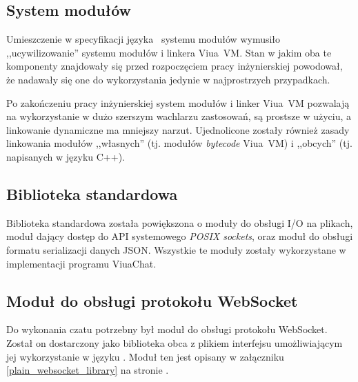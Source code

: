 \subsection{System modułów}

Umieszczenie w specyfikacji języka \ViuAct\ systemu modułów wymusiło
,,ucywilizowanie'' systemu modułów i linkera Viua~VM. Stan w jakim oba te
komponenty znajdowały się przed rozpoczęciem pracy inżynierskiej powodował, że
nadawały się one do wykorzystania jedynie w najprostrzych przypadkach.

Po zakończeniu pracy inżynierskiej system modułów i linker Viua~VM pozwalają na
wykorzystanie w dużo szerszym wachlarzu zastosowań, są prostsze w użyciu, a
linkowanie dynamiczne ma mniejszy narzut. Ujednolicone zostały również zasady
linkowania modułów ,,własnych'' (tj. modułów \emph{bytecode} Viua~VM) i
,,obcych'' (tj. napisanych w języku C++).

\subsection{Biblioteka standardowa}

Biblioteka standardowa została powiększona o moduły do obsługi I/O na plikach,
moduł dający dostęp do API systemowego \emph{POSIX sockets}, oraz moduł do
obsługi formatu serializacji danych JSON.
Wszystkie te moduły zostały wykorzystane w implementacji programu ViuaChat.

\subsection{Moduł do obsługi protokołu WebSocket}

Do wykonania czatu potrzebny był moduł do obsługi protokołu WebSocket.
Został on dostarczony jako biblioteka obca z plikiem interfejsu umożliwiającym
jej wykorzystanie w języku \ViuAct. Moduł ten jest opisany w załączniku
\ref{plain_websocket_library} na stronie \pageref{plain_websocket_library}.
